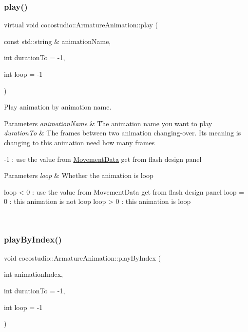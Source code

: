 \subsubsection{\texorpdfstring{play()}{play()}\hspace{0.1cm}{\footnotesize\ttfamily [2/2]}}
{\footnotesize\ttfamily virtual void cocostudio\+::\+Armature\+Animation\+::play (\begin{DoxyParamCaption}\item[{const std\+::string \&}]{animation\+Name,  }\item[{int}]{duration\+To = {\ttfamily -\/1},  }\item[{int}]{loop = {\ttfamily -\/1} }\end{DoxyParamCaption})\hspace{0.3cm}{\ttfamily [virtual]}}

Play animation by animation name.


\begin{DoxyParams}{Parameters}
{\em animation\+Name} & The animation name you want to play \\
\hline
{\em duration\+To} & The frames between two animation changing-\/over. It\textquotesingle{}s meaning is changing to this animation need how many frames\\
\hline
\end{DoxyParams}
-\/1 \+: use the value from \hyperlink{classcocostudio_1_1MovementData}{Movement\+Data} get from flash design panel 
\begin{DoxyParams}{Parameters}
{\em loop} & Whether the animation is loop \begin{DoxyVerb}    loop < 0 : use the value from MovementData get from flash design panel
    loop = 0 : this animation is not loop
    loop > 0 : this animation is loop\end{DoxyVerb}
 \\
\hline
\end{DoxyParams}
\mbox{\label{classcocostudio_1_1ArmatureAnimation_a31461695f1c48a33f49fb9d9fecedee5}} 
\subsubsection{\texorpdfstring{play\+By\+Index()}{playByIndex()}\hspace{0.1cm}{\footnotesize\ttfamily [1/2]}}
{\footnotesize\ttfamily void cocostudio\+::\+Armature\+Animation\+::play\+By\+Index (\begin{DoxyParamCaption}\item[{int}]{animation\+Index,  }\item[{int}]{duration\+To = {\ttfamily -\/1},  }\item[{int}]{loop = {\ttfamily -\/1} }\end{DoxyParamCaption})\hspace{0.3cm}{\ttfamily [virtual]}}

